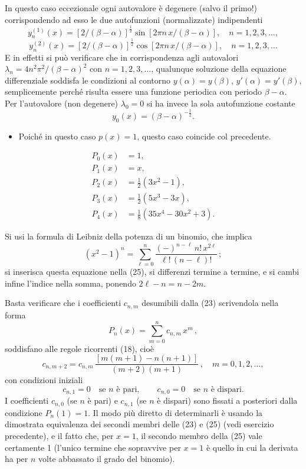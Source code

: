 \documentclass[11pt, a4paper]{book}
\numberwithin{equation}{section}
\begin{document}
\begin{description}
In questo caso eccezionale ogni autovalore è degenere (salvo il primo!) corrispondendo ad esso le due autofunzioni (normalizzate) indipendenti
\[
  y_n^{(1)}(x) = \left[2/(\beta-\alpha)\right]^{\frac{1}{2}}
  \sin\!\left[2\pi n\,x/(\beta-\alpha)\right],\quad n=1,2,3,\ldots,
\]
\[
  y_n^{(2)}(x) = \left[2/(\beta-\alpha)\right]^{\frac{1}{2}}
  \cos\!\left[2\pi n\,x/(\beta-\alpha)\right],\quad n=1,2,3,\ldots
\]
E in effetti si può verificare che in corrispondenza agli autovalori $\lambda_n = 4n^2\pi^2/(\beta-\alpha)^2$ con $n=1,2,3,\ldots$, qualunque soluzione della equazione differenziale soddisfa le condizioni al contorno $y(\alpha)=y(\beta)$, $y'(\alpha)=y'(\beta)$, semplicemente perché risulta essere una funzione periodica con periodo $\beta-\alpha$. Per l'autovalore (non degenere) $\lambda_0=0$ si ha invece la sola autofunzione costante
\[
  y_0(x) = (\beta-\alpha)^{-\frac{1}{2}}.
\]
  \begin{itemize}
    \item[iv)] Poiché in questo caso $p(x)=1$, questo caso coincide col precedente.
  \end{itemize}

\item[7-4]
\begin{align*}
  P_0(x) &= 1,\\
  P_1(x) &= x,\\
  P_2(x) &= \tfrac{1}{2}(3x^2-1),\\
  P_3(x) &= \tfrac{1}{2}(5x^3-3x),\\
  P_4(x) &= \tfrac{1}{8}(35x^4-30x^2+3).
\end{align*}

\item[7-5] Si usi la formula di Leibniz della potenza di un binomio, che implica
\[
  (x^2-1)^n = \sum_{\ell=0}^{n} \frac{(-)^{n-\ell}\,n!\,x^{2\ell}}{\ell!\,(n-\ell)!}\,;
\]
si inserisca questa equazione nella (25), si differenzi termine a termine, e si cambi infine l'indice nella somma, ponendo $2\ell-n = n-2m$.

\item[7-6] Basta verificare che i coefficienti $c_{n,m}$ desumibili dalla (23) scrivendola nella forma
\[
  P_n(x) = \sum_{m=0}^{n} c_{n,m}\, x^m\,,
\]
soddisfano alle regole ricorrenti (18), cioè
\[
  c_{n,m+2} = c_{n,m}\,\frac{[m(m+1)-n(n+1)]}{(m+2)(m+1)}\,,\quad m=0,1,2,\ldots,
\]
con condizioni iniziali
\[
  c_{n,1} = 0 \quad\text{se } n \text{ è pari},\qquad
  c_{n,0} = 0 \quad\text{se } n \text{ è dispari}.
\]
I coefficienti $c_{n,0}$ (se $n$ è pari) e $c_{n,1}$ (se $n$ è dispari) sono fissati a posteriori dalla condizione $P_n(1)=1$. Il modo più diretto di determinarli è usando la dimostrata equivalenza dei secondi membri delle (23) e (25) (vedi esercizio precedente), e il fatto che, per $x=1$, il secondo membro della (25) vale certamente 1 (l'unico termine che sopravvive per $x=1$ è quello in cui la derivata ha per $n$ volte abbassato il grado del binomio).


\end{description}
\end{document}
